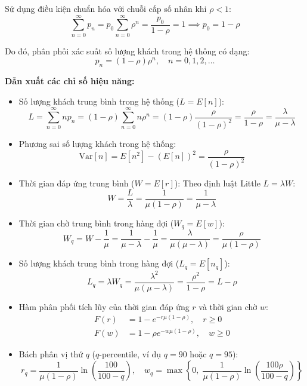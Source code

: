 Sử dụng điều kiện chuẩn hóa với chuỗi cấp số nhân khi $\rho < 1$:
\begin{equation}
    \sum_{n=0}^\infty p_n = p_0 \sum_{n=0}^\infty \rho^n = \frac{p_0}{1 - \rho} = 1 \implies p_0 = 1 - \rho
\end{equation}

Do đó, phân phối xác suất số lượng khách trong hệ thống có dạng:
\begin{equation}
    p_n = (1 - \rho)\rho^n, \quad n = 0, 1, 2, \dots
\end{equation}

\textbf{Dẫn xuất các chỉ số hiệu năng:}
\begin{itemize}[leftmargin=1.5em]
    \item Số lượng khách trung bình trong hệ thống ($L = E[n]$):
    \begin{equation}
        L = \sum_{n=0}^\infty n p_n = (1 - \rho)\sum_{n=0}^\infty n \rho^n = (1 - \rho) \frac{\rho}{(1 - \rho)^2} = \frac{\rho}{1 - \rho} = \frac{\lambda}{\mu - \lambda}
    \end{equation}
    \item Phương sai số lượng khách trong hệ thống:
    \begin{equation}
        \text{Var}[n] = E[n^2] - (E[n])^2 = \frac{\rho}{(1 - \rho)^2}
    \end{equation}
    \item Thời gian đáp ứng trung bình ($W = E[r]$): Theo định luật Little $L = \lambda W$:
    \begin{equation}
        W = \frac{L}{\lambda} = \frac{1}{\mu(1 - \rho)} = \frac{1}{\mu - \lambda}
    \end{equation}
    \item Thời gian chờ trung bình trong hàng đợi ($W_q = E[w]$):
    \begin{equation}
        W_q = W - \frac{1}{\mu} = \frac{1}{\mu - \lambda} - \frac{1}{\mu} = \frac{\lambda}{\mu(\mu - \lambda)} = \frac{\rho}{\mu(1 - \rho)}
    \end{equation}
    \item Số lượng khách trung bình trong hàng đợi ($L_q = E[n_q]$):
    \begin{equation}
        L_q = \lambda W_q = \frac{\lambda^2}{\mu(\mu - \lambda)} = \frac{\rho^2}{1 - \rho} = L - \rho
    \end{equation}
    \item Hàm phân phối tích lũy của thời gian đáp ứng $r$ và thời gian chờ $w$:
    \begin{align}
        F(r) &= 1 - e^{-r\mu(1-\rho)}, \quad r \ge 0 \\
        F(w) &= 1 - \rho e^{-w\mu(1-\rho)}, \quad w \ge 0
    \end{align}
    \item Bách phân vị thứ $q$ ($q$-percentile, ví dụ $q=90$ hoặc $q=95$):
    \begin{equation}
        r_q = \frac{1}{\mu(1 - \rho)} \ln\left(\frac{100}{100 - q}\right), \quad w_q = \max\left\{0, \; \frac{1}{\mu(1 - \rho)} \ln\left(\frac{100\rho}{100 - q}\right)\right\}
    \end{equation}
\end{itemize}

